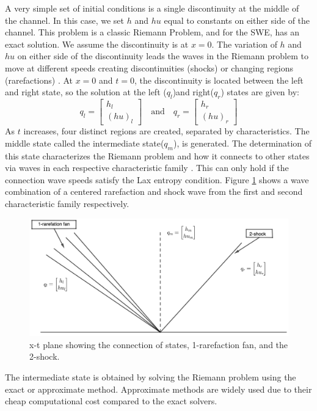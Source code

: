 \documentclass[11pt,a4paper]{article}
\begin{document}
	A very simple set of initial conditions is a single discontinuity at the middle of the channel.  In this case, we set $h$ and $hu$ equal to constants on either side of the channel.  This problem is a classic Riemann Problem, and for the SWE, has an exact solution.  We assume the discontinuity is at $x = 0$. 
	The variation of $h$ and $hu$ on either side of the discontinuity leads the waves in the Riemann problem to move at different speeds creating discontinuities (shocks) or changing regions (rarefactions) \cite{leveque2002finite}.  At $x = 0$ and $t = 0$,   the discontinuity is located between the left and right state, so the solution at the left ($q_{l}$)and right($q_{r}$) states are given by: 
	\begin{equation}
		q_{l} = \begin{bmatrix}
			h_{l} \\( hu)_{l}
		\end{bmatrix}  \quad \text{and} \quad q_{r} = \begin{bmatrix}
			h_{r} \\( hu)_{r}
		\end{bmatrix} 
		\label{ic}
	\end{equation}
	As $t$ increases, four distinct regions are created, separated by characteristics. 
	The middle state called the intermediate state($q_{m}$), is generated.  The determination of this state characterizes the Riemann problem and how it connects to other states via waves in each respective characteristic family \cite{ba-le-mi-ro:2003}.  This can only hold if the connection wave speeds satisfy the Lax entropy condition. Figure \ref{fig:x-tplane} shows a wave combination of a centered rarefaction  and shock wave from the first and second characteristic family respectively.
	
	\begin{figure}[H]
		\centering
		\includegraphics[width=0.5\linewidth]{images/geo1}
		\caption{ x-t plane showing the connection of states, 1-rarefaction fan, and the 2-shock.}
		\label{fig:x-tplane}
	\end{figure}
	
	The intermediate state is obtained by solving the Riemann problem using the exact or  approximate method. Approximate methods are widely used due to their cheap computational cost compared to the exact solvers.
	
\end{document}
